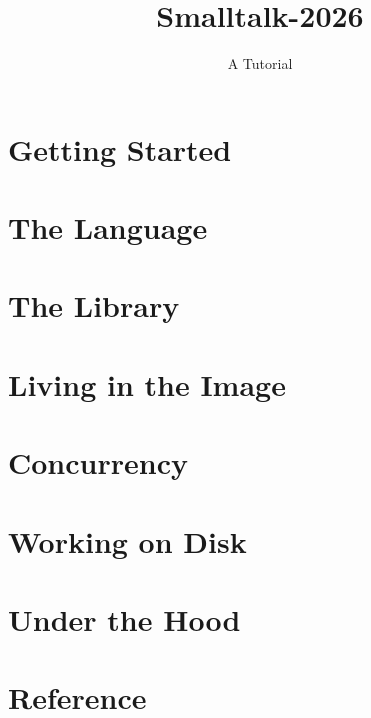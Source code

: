\documentclass[11pt,openright,twoside]{book}
\title{Smalltalk-2026}
\author{A Tutorial}
\date{}
\begin{document}
\frontmatter

\tableofcontents

\mainmatter

\part{Getting Started}




\part{The Language}









\part{The Library}






\part{Living in the Image}




\part{Concurrency}




\part{Working on Disk}




\part{Under the Hood}


\appendix
\part{Reference}





\end{document}
